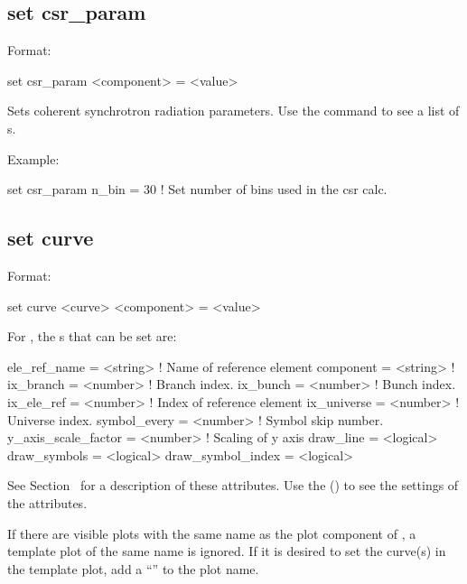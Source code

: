 {{%

\subsection{set csr_param}
\label{s:set.csr.param}

Format:
\begin{example}
  set csr_param <component> = <value>
\end{example}

Sets coherent synchrotron radiation parameters. Use the 
command to see a list of s.

Example:
\begin{example}
  set csr_param n_bin = 30  ! Set number of bins used in the csr calc.
\end{example}


\subsection{set curve}
\label{s:set.curve}

Format:
\begin{example}
  set curve <curve> <component> = <value>
\end{example}

For , the s that can be set are:
\begin{example}
  ele_ref_name        = <string>  ! Name of reference element
  component           = <string>  ! 
  ix_branch           = <number>  ! Branch index.
  ix_bunch            = <number>  ! Bunch index.
  ix_ele_ref          = <number>  ! Index of reference element
  ix_universe         = <number>  ! Universe index.
  symbol_every        = <number>  ! Symbol skip number.
  y_axis_scale_factor = <number>  ! Scaling of y axis
  draw_line           = <logical> 
  draw_symbols        = <logical> 
  draw_symbol_index   = <logical> 
\end{example}
See Section~ for a description of these attributes.  Use the  () to see the settings of the attributes.

If there are visible plots with the same name as the plot component of , a template plot
of the same name is ignored. If it is desired to set the curve(s) in the template plot, add a
``'' to the plot name.

}}
